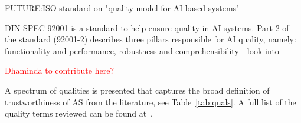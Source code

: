 FUTURE:ISO standard on "quality model for AI-based systems"


DIN SPEC 92001 is a standard to help ensure quality in AI systems. Part 2 of the standard (92001-2) describes three pillars responsible for AI quality, namely: functionality and performance, robustness and comprehensibility - look into










\textcolor{red}{Dhaminda to contribute here?}


A spectrum of qualities is presented that captures the broad definition of trustworthiness of AS from the literature, see Table~\ref{tab:quals}. A full list of the quality terms reviewed can be found at~\cite{tsl_git}.

